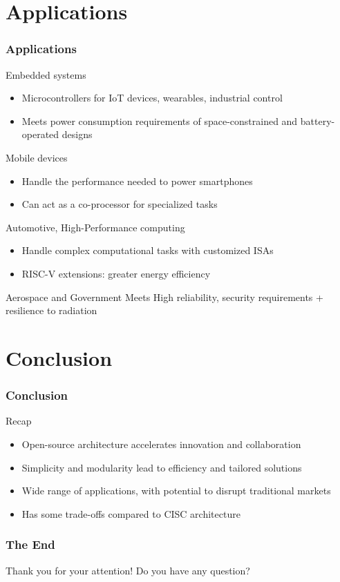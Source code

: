 \documentclass{beamer}
\begin{document}
	\section{Applications}
	\begin{frame}
		\frametitle{Applications}
		
		\begin{alertblock}{Embedded systems}
			\begin{itemize}
				\item Microcontrollers for IoT devices, wearables, industrial control
				\item Meets power consumption requirements of space-constrained and battery-operated designs
			\end{itemize}
		\end{alertblock}
		
		\begin{alertblock}{Mobile devices}
			\begin{itemize}
				\item Handle the performance needed to power smartphones
				\item Can act as a co-processor for specialized tasks
			\end{itemize}
		\end{alertblock}
		
		\begin{alertblock}{Automotive, High-Performance computing}
			\begin{itemize}
				\item Handle complex computational tasks with customized ISAs
				\item RISC-V extensions: greater energy efficiency
			\end{itemize}
		\end{alertblock}
		
		\begin{alertblock}{Aerospace and Government}
				Meets High reliability, security requirements + resilience to radiation
		\end{alertblock}
	\end{frame}
	
	\section{Conclusion}
	\begin{frame}
		\frametitle{Conclusion}
		
		\begin{alertblock}{Recap}
			\begin{itemize}
				\item Open-source architecture accelerates innovation and collaboration
				\item Simplicity and modularity lead to efficiency and tailored solutions
				\item Wide range of applications, with potential to disrupt traditional markets
				\item Has some trade-offs compared to CISC architecture
			\end{itemize}
		\end{alertblock}
	\end{frame}
	
	\begin{frame}
		\frametitle{The End}
		
		\centering
		Thank you for your attention!
		\linebreak
		Do you have any question?
	\end{frame}
\end{document}
